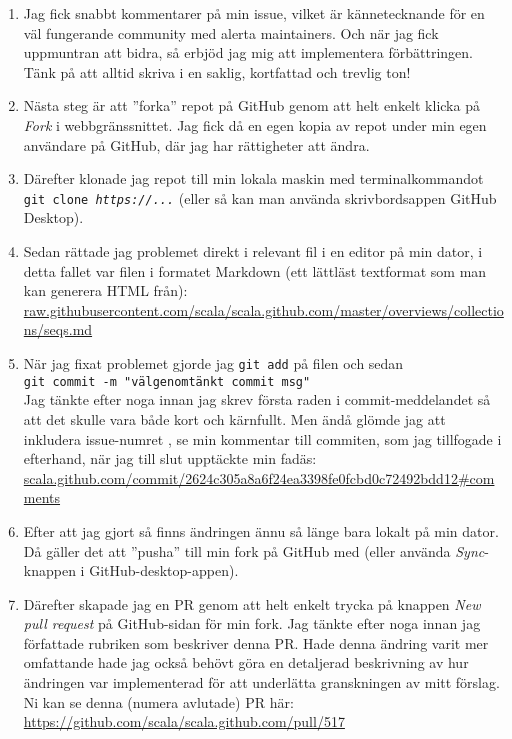 \begin{enumerate}
\item Jag fick snabbt kommentarer på min issue, vilket är kännetecknande för en väl fungerande community med alerta maintainers. Och när jag fick uppmuntran att bidra, så erbjöd jag mig att implementera förbättringen. Tänk på att alltid skriva i en saklig, kortfattad och trevlig ton!

\item Nästa steg är att ''forka'' repot på GitHub genom att helt enkelt klicka på \emph{Fork} i webbgränssnittet. Jag fick då en egen kopia av repot under min egen användare på GitHub, där jag har rättigheter att ändra. 

\item Därefter klonade jag repot till min lokala maskin med terminalkommandot \texttt{ git clone \emph{https://...}} (eller så kan man använda skrivbordsappen GitHub Desktop).

\item Sedan rättade jag problemet direkt i relevant fil i en editor på min dator, i detta fallet var filen i formatet Markdown (ett lättläst textformat som man kan generera HTML från): \\ {\small\href{https://raw.githubusercontent.com/scala/scala.github.com/master/overviews/collections/seqs.md}{raw.githubusercontent.com/scala/scala.github.com/master/overviews/collections/seqs.md}}

\item När jag fixat problemet gjorde jag \texttt{git add} på filen och sedan \\ \texttt{git commit -m "välgenomtänkt commit msg"} \\ Jag tänkte efter noga innan jag skrev första raden i commit-meddelandet så att det skulle vara både kort och kärnfullt. Men ändå glömde jag att inkludera issue-numret \code{:(}, se min kommentar till commiten, som jag tillfogade i efterhand, när jag till slut upptäckte min fadäs:\\ {\small\href{https://github.com/bjornregnell/scala.github.com/commit/2624c305a8a6f24ea3398fe0fcbd0c72492bdd12#comments}{scala.github.com/commit/2624c305a8a6f24ea3398fe0fcbd0c72492bdd12\#comments}}

\item Efter att jag gjort  så finns ändringen ännu så länge bara lokalt på min dator. Då gäller det att ''pusha'' till min fork på GitHub med  (eller använda \emph{Sync}-knappen i GitHub-desktop-appen).

\item Därefter skapade jag en PR genom att helt enkelt trycka på knappen \emph{New pull request} på GitHub-sidan för min fork. Jag tänkte efter noga innan jag författade rubriken som beskriver denna PR. Hade denna ändring varit mer omfattande hade jag också behövt göra en detaljerad beskrivning av hur ändringen var implementerad för att underlätta granskningen av mitt förslag. Ni kan se denna (numera avlutade) PR här: \\{\url{https://github.com/scala/scala.github.com/pull/517}}


\end{enumerate}
